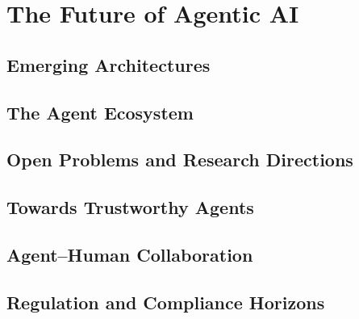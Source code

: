 \documentclass[
  11pt,
  twoside,
  openright
]{book}
\begin{document}
\part{The Future of Agentic AI}
\label{part:future}

\chapter{Emerging Architectures}
\label{ch:emerging-architectures}

\chapter{The Agent Ecosystem}
\label{ch:agent-ecosystem}

\chapter{Open Problems and Research Directions}
\label{ch:open-problems}

\chapter{Towards Trustworthy Agents}
\label{ch:trustworthy-agents}

\chapter{Agent--Human Collaboration}
\label{ch:agent-human-collaboration}

\chapter{Regulation and Compliance Horizons}
\label{ch:regulation-compliance}

\end{document}
